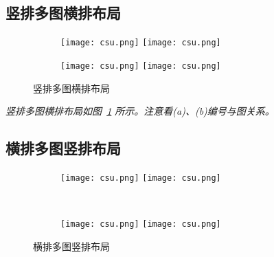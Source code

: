 \lipsum

\subsection{竖排多图横排布局}

\begin{figure}[!htb]
    \centering
    \begin{subfigure}[t]{0.13\linewidth}
        \caption{}
        \begin{minipage}[b]{1\linewidth}
        \texttt{[image: csu.png]} \vspace{-1ex} \vfill
        \texttt{[image: csu.png]}
        \end{minipage}
    \end{subfigure}
    \begin{subfigure}[t]{0.13\linewidth}
        \caption{}
        \begin{minipage}[b]{1\linewidth}
        \texttt{[image: csu.png]} \vspace{-1ex} \vfill
        \texttt{[image: csu.png]}
        \end{minipage}
    \end{subfigure}
    \caption{竖排多图横排布局}
    \label{F.csu_col_row}
\end{figure}

\emph{竖排多图横排布局如图~\ref{F.csu_col_row} 所示。注意看(a)、(b)编号与图关系。}


\subsection{横排多图竖排布局}

\lipsum

\begin{figure}[!htb]
    \centering
    \begin{subfigure}[t]{0.3\linewidth}
        \caption{}
        \begin{minipage}[b]{1\linewidth}
        \texttt{[image: csu.png]}
        \texttt{[image: csu.png]}
        \end{minipage}
    \end{subfigure}\\
    \begin{subfigure}[t]{0.3\linewidth}
        \caption{}
        \begin{minipage}[b]{1\linewidth}
        \texttt{[image: csu.png]}
        \texttt{[image: csu.png]}
        \end{minipage}
    \end{subfigure}
    \caption{横排多图竖排布局}
    \label{F.csu_row_col}
\end{figure}

